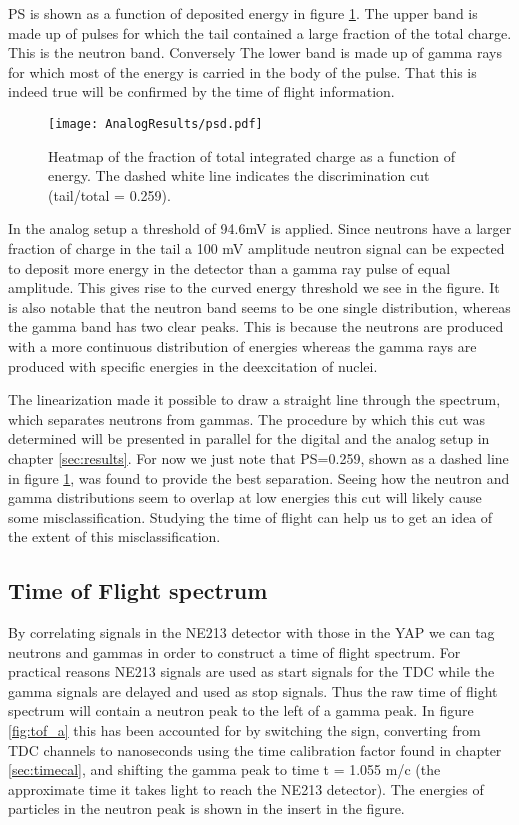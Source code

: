\documentclass[main.tex]{subfiles}
\begin{document}
PS is shown as a function of deposited energy in figure \ref{fig:psd_a}. The upper band is made up of pulses for which the tail contained a large fraction of the total charge. This is the neutron band. Conversely The lower band is made up of gamma rays for which most of the energy is carried in the body of the pulse. That this is indeed true will be confirmed by the time of flight information.

\begin{figure}[ht]
    \centering
        \texttt{[image: AnalogResults/psd.pdf]}
        \caption{Heatmap of the fraction of total integrated charge as a function of energy. The dashed white line indicates the discrimination cut (tail/total = 0.259).}
        \label{fig:psd_a}
\end{figure}
In the analog setup a threshold of 94.6\si{\milli\volt} is applied. Since neutrons have a larger fraction of charge in the tail a 100 mV amplitude neutron signal can be expected to deposit more energy in the detector than a gamma ray pulse of equal amplitude. This gives rise to the curved energy threshold we see in the figure. It is also notable that the neutron band seems to be one single distribution, whereas the gamma band has two clear peaks. This is because the neutrons are produced with a more continuous distribution of energies whereas the gamma rays are produced with specific energies in the deexcitation of nuclei.

The linearization made it possible to draw a straight line through the spectrum, which separates neutrons from gammas. The procedure by which this cut was determined will be presented in parallel for the digital and the analog setup in chapter \ref{sec:results}. For now we just note that PS=0.259, shown as a dashed line in figure \ref{fig:psd_a}, was found to provide the best separation. Seeing how the neutron and gamma distributions seem to overlap at low energies this cut will likely cause some misclassification. Studying the time of flight can help us to get an idea of the extent of this misclassification.


\subsection{Time of Flight spectrum}
By correlating signals in the NE213 detector with those in the YAP we can tag neutrons and gammas in order to construct a time of flight spectrum. For practical reasons NE213 signals are used as start signals for the TDC while the gamma signals are delayed and used as stop signals. Thus the raw time of flight spectrum will contain a neutron peak to the left of a gamma peak. In figure \ref{fig:tof_a} this has been accounted for by switching the sign, converting from TDC channels to nanoseconds using the time calibration factor found in chapter \ref{sec:timecal}, and shifting the gamma peak to time t = 1.055 m/c (the approximate time it takes light to reach the NE213 detector). The energies of particles in the neutron peak is shown in the insert in the figure.
\end{document}
